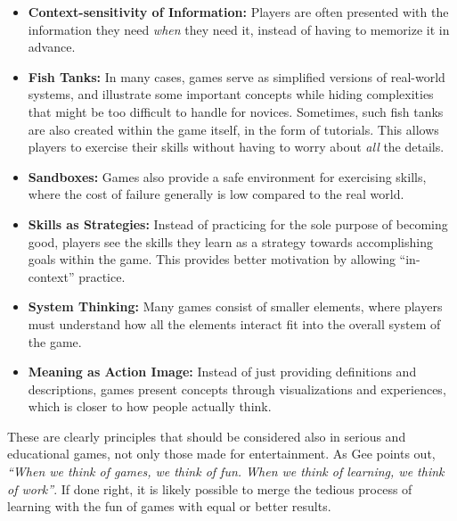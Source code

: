 \begin{itemize}
	\item{\textbf{Context-sensitivity of Information:}} Players are often presented with the information they need \emph{when} they need it, instead of having to memorize it in advance.
	\item{\textbf{Fish Tanks:}} In many cases, games serve as simplified versions of real-world systems, and illustrate some important concepts while hiding complexities that might be too difficult to handle for novices. Sometimes, such fish tanks are also created within the game itself, in the form of tutorials. This allows players to exercise their skills without having to worry about \emph{all} the details.
	\item{\textbf{Sandboxes:}} Games also provide a safe environment for exercising skills, where the cost of failure generally is low compared to the real world.
	\item{\textbf{Skills as Strategies:}} Instead of practicing for the sole purpose of becoming good, players see the skills they learn as a strategy towards accomplishing goals within the game. This provides better motivation by allowing ``in-context'' practice.
	\item{\textbf{System Thinking:}} Many games consist of smaller elements, where players must understand how all the elements interact fit into the overall system of the game.
	\item{\textbf{Meaning as Action Image:}} Instead of just providing definitions and descriptions, games present concepts through visualizations and experiences, which is closer to how people actually think.
\end{itemize}

\noindent
These are clearly principles that should be considered also in serious and educational games, not only those made for entertainment. As Gee points out, \emph{``When we think of games, we think of fun. When we think of learning, we think of work''}. If done right, it is likely possible to merge the tedious process of learning with the fun of games with equal or better results.




